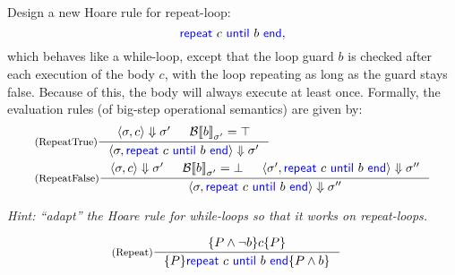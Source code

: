 \documentclass[11pt,a4paper]{article}
\newcommand{\pair}[1]{\langle #1 \rangle}
\newcommand{\evalB}[2]{{\mathcal{B}\llbracket #1 \rrbracket}_{#2}}
\newcommand{\evalC}[3]{\pair{#1, #2} \Downarrow #3}
\newcommand{\kword}[1]{{\color{blue} \textsf{#1}}}
\newcommand{\End}{\kword{end}}
\newcommand{\Repeat}{\kword{repeat}}
\newcommand{\Until}{\kword{until}}
\begin{document}
\subproblem Design a new Hoare rule for repeat-loop:
$$\Repeat~c~\Until~b~\End,$$
which behaves like a while-loop, except that the loop guard $b$ is checked after each execution of the body $c$,
with the loop repeating as long as the guard stays false.
Because of this, the body will always execute at least once.
Formally, the evaluation rules (of big-step operational semantics) are given by:
\begin{align*}
	&\inference[(RepeatTrue)]{\evalC{\sigma}{c}{\sigma'} & \evalB{b}{\sigma'}=\top}
		{\evalC{\sigma}{\Repeat~c~\Until~b~\End}{\sigma'}} \\
	&\inference[(RepeatFalse)]{\evalC{\sigma}{c}{\sigma'} & \evalB{b}{\sigma'}=\bot &
		\evalC{\sigma'}{\Repeat~c~\Until~b~\End}{\sigma''}}
		{\evalC{\sigma}{\Repeat~c~\Until~b~\End}{\sigma''}}
\end{align*}

\emph{Hint: ``adapt'' the Hoare rule for while-loops so that it works on repeat-loops.}

\begin{solution}
	\begin{align*}
	&\inference[(Repeat)]{\{P \land \lnot b\}c\{P\}}
	{\{P\}\Repeat~c~\Until~b~\End\{P\land b\}}
	\end{align*}
\end{solution}

\end{document}
